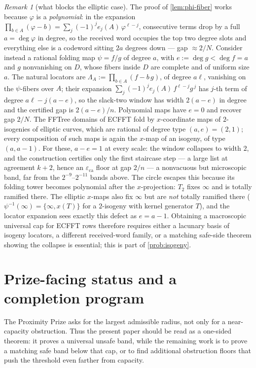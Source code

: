 \documentclass[11pt]{article}
\theoremstyle{definition}
\theoremstyle{remark}
\newtheorem{remark}[theorem]{Remark}
\newcommand{\eca}{\varepsilon_{\mathrm{ca}}}
\begin{document}
\begin{remark}[what blocks the elliptic case]\label{rem:ecfft-obstruction}
The proof of \cref{lem:phi-fiber} works because $\varphi$ is a \emph{polynomial}: in the expansion $\prod_{b\in A}(\varphi-b)=\sum_j(-1)^je_j(A)\,\varphi^{\ell-j}$, consecutive terms drop by a full $a=\deg\varphi$ in degree, so the received word occupies the top two degree slots and everything else is a codeword sitting $2a$ degrees down --- gap $\approx2/N$. Consider instead a rational folding map $\psi=f/g$ of degree $a$, with $e:=\deg g<\deg f=a$ and $g$ nonvanishing on $D$, whose fibers inside $D$ are complete and of uniform size $a$. The natural locators are $\Lambda_A:=\prod_{b\in A}(f-b\,g)$, of degree $a\ell$, vanishing on the $\psi$-fibers over $A$; their expansion $\sum_j(-1)^je_j(A)\,f^{\ell-j}g^{\,j}$ has $j$-th term of degree $a\ell-j(a-e)$, so the slack-two window has width $2(a-e)$ in degree and the certified gap is $2(a-e)/n$. Polynomial maps have $e=0$ and recover gap $2/N$. The FFTree domains of ECFFT \cite{BCKL21} fold by $x$-coordinate maps of $2$-isogenies of elliptic curves, which are rational of degree type $(a,e)=(2,1)$; every composition of such maps is again the $x$-map of an isogeny, of type $(a,a-1)$. For these, $a-e=1$ at every scale: the window collapses to width $2$, and the construction certifies only the first staircase step --- a large list at agreement $k+2$, hence an $\eca$ floor at gap $2/n$ --- a nonvacuous but microscopic band, far from the $2^{-9}$--$2^{-11}$ bands above. The circle escapes this because its folding tower becomes polynomial after the $x$-projection: $T_2$ fixes $\infty$ and is totally ramified there. The elliptic $x$-maps also fix $\infty$ but are \emph{not} totally ramified there ($\psi^{-1}(\infty)=\{\infty,x(T)\}$ for a $2$-isogeny with kernel generator $T$), and the locator expansion sees exactly this defect as $e=a-1$. Obtaining a macroscopic universal cap for ECFFT rows therefore requires either a lacunary basis of isogeny locators, a different received-word family, or a matching safe-side theorem showing the collapse is essential; this is part of \cref{prob:isogeny}.
\end{remark}


\section{Prize-facing status and a completion program}\label{sec:prize-program}

The Proximity Prize asks for the largest admissible radius, not only for a
near-capacity obstruction.  Thus the present paper should be read as a
one-sided theorem: it proves a universal unsafe band, while the remaining work
is to prove a matching safe band below that cap, or to find additional
obstruction floors that push the threshold even farther from capacity.
\end{document}
